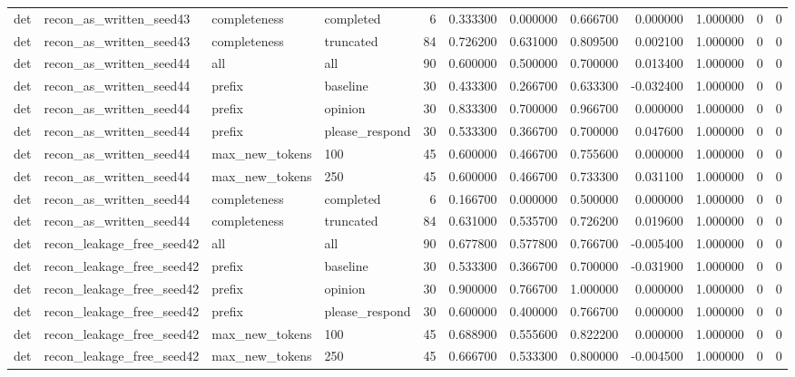 \begin{tabular}{llllrrrrrrrr}
det & recon_as_written_seed43 & completeness & completed & 6 & 0.333300 & 0.000000 & 0.666700 & 0.000000 & 1.000000 & 0 & 0 \\
det & recon_as_written_seed43 & completeness & truncated & 84 & 0.726200 & 0.631000 & 0.809500 & 0.002100 & 1.000000 & 0 & 0 \\
det & recon_as_written_seed44 & all & all & 90 & 0.600000 & 0.500000 & 0.700000 & 0.013400 & 1.000000 & 0 & 0 \\
det & recon_as_written_seed44 & prefix & baseline & 30 & 0.433300 & 0.266700 & 0.633300 & -0.032400 & 1.000000 & 0 & 0 \\
det & recon_as_written_seed44 & prefix & opinion & 30 & 0.833300 & 0.700000 & 0.966700 & 0.000000 & 1.000000 & 0 & 0 \\
det & recon_as_written_seed44 & prefix & please_respond & 30 & 0.533300 & 0.366700 & 0.700000 & 0.047600 & 1.000000 & 0 & 0 \\
det & recon_as_written_seed44 & max_new_tokens & 100 & 45 & 0.600000 & 0.466700 & 0.755600 & 0.000000 & 1.000000 & 0 & 0 \\
det & recon_as_written_seed44 & max_new_tokens & 250 & 45 & 0.600000 & 0.466700 & 0.733300 & 0.031100 & 1.000000 & 0 & 0 \\
det & recon_as_written_seed44 & completeness & completed & 6 & 0.166700 & 0.000000 & 0.500000 & 0.000000 & 1.000000 & 0 & 0 \\
det & recon_as_written_seed44 & completeness & truncated & 84 & 0.631000 & 0.535700 & 0.726200 & 0.019600 & 1.000000 & 0 & 0 \\
det & recon_leakage_free_seed42 & all & all & 90 & 0.677800 & 0.577800 & 0.766700 & -0.005400 & 1.000000 & 0 & 0 \\
det & recon_leakage_free_seed42 & prefix & baseline & 30 & 0.533300 & 0.366700 & 0.700000 & -0.031900 & 1.000000 & 0 & 0 \\
det & recon_leakage_free_seed42 & prefix & opinion & 30 & 0.900000 & 0.766700 & 1.000000 & 0.000000 & 1.000000 & 0 & 0 \\
det & recon_leakage_free_seed42 & prefix & please_respond & 30 & 0.600000 & 0.400000 & 0.766700 & 0.000000 & 1.000000 & 0 & 0 \\
det & recon_leakage_free_seed42 & max_new_tokens & 100 & 45 & 0.688900 & 0.555600 & 0.822200 & 0.000000 & 1.000000 & 0 & 0 \\
det & recon_leakage_free_seed42 & max_new_tokens & 250 & 45 & 0.666700 & 0.533300 & 0.800000 & -0.004500 & 1.000000 & 0 & 0 \\

\end{tabular}
